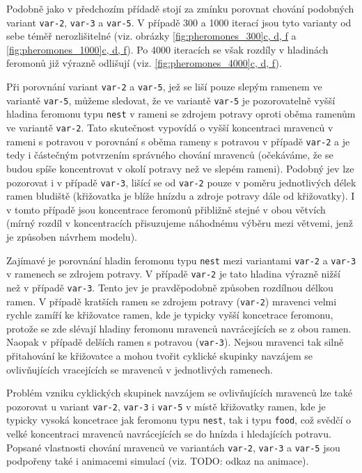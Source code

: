 \documentclass[10pt,a4paper,twocolumn]{article}
\begin{document}
Podobně jako v předchozím přídadě stojí za zmínku porovnat chování
podobných variant \texttt{var-2}, \texttt{var-3} a \texttt{var-5}. 
V případě 300 a 1000 iterací jsou tyto varianty od sebe téměř 
nerozlišitelné (viz. obrázky \hyperref[fig:pheromones_300]{\ref*{fig:pheromones_300}c, d, f}
a \hyperref[fig:pheromones_1000]{\ref*{fig:pheromones_1000}c, d, f}). Po 4000
iteracích se však rozdíly v hladinách feromonů již výrazně 
odlišují (viz. \hyperref[fig:pheromones_4000]{\ref*{fig:pheromones_4000}c, d, f}).

Při porovnání variant \texttt{var-2} a \texttt{var-5}, jež se liší
pouze slepým ramenem ve variantě \texttt{var-5}, můžeme sledovat, že
ve variantě \texttt{var-5} je pozorovatelně vyšší hladina feromonu
typu \texttt{nest} v rameni se zdrojem potravy oproti oběma ramenům
ve variantě \texttt{var-2}. Tato skutečnost vypovídá
o vyšší koncentraci mravenců v rameni s potravou v porovnání s oběma
rameny s potravou v případě \texttt{var-2} a je tedy i částečným 
potvrzením správného chování mravenců (očekáváme, že se budou 
spíše koncentrovat v okolí potravy než ve slepém rameni). Podobný jev
lze pozorovat i v případě \texttt{var-3}, lišící se od \texttt{var-2}
pouze v poměru jednotlivých délek ramen bludiště (křižovatka je blíže 
hnízdu a zdroje potravy dále od křižovatky). I v tomto případě jsou
koncentrace feromonů přibližně stejné v obou větvích (mírný rozdíl 
v koncentracích přisuzujeme náhodnému výběru mezi větvemi, 
jenž je způsoben návrhem modelu). 

Zajímavé je porovnání hladin feromonu typu \texttt{nest} mezi variantami 
\texttt{var-2} a \texttt{var-3} v ramenech se zdrojem potravy. 
V případě \texttt{var-2} je tato hladina výrazně nižší než v případě
\texttt{var-3}. Tento jev je pravděpodobně způsoben rozdílnou délkou 
ramen. V případě kratších ramen se zdrojem potravy 
(\texttt{var-2}) mravenci velmi rychle zamíří ke křižovatce ramen,
kde je typicky vyšší koncetrace feromonu, protože se zde slévají
hladiny feromonu mravenců navrácejících se z obou ramen. Naopak v 
případě delších ramen s potravou (\texttt{var-3}). Nejsou mravenci
tak silně přitahování ke křižovatce a mohou tvořit cyklické skupinky
navzájem se ovlivňujících vracejících se mravenců v jednotlivých 
ramenech. 

Problém vzniku cyklických skupinek navzájem se ovlivňujících
mravenců lze také pozorovat u variant \texttt{var-2}, \texttt{var-3} i 
\texttt{var-5} v místě křižovatky ramen, kde je typicky
vysoká koncetrace jak feromonu typu \texttt{nest}, tak i typu 
\texttt{food}, což svědčí o velké koncentraci mravenců navrácejících
se do hnízda i hledajících potravu. Popsané vlastnosti chování mravenců
ve variantách \texttt{var-2}, \texttt{var-3} a \texttt{var-5} jsou
podpořeny také i animacemi simulací (viz. TODO: odkaz na animace).
\end{document}
